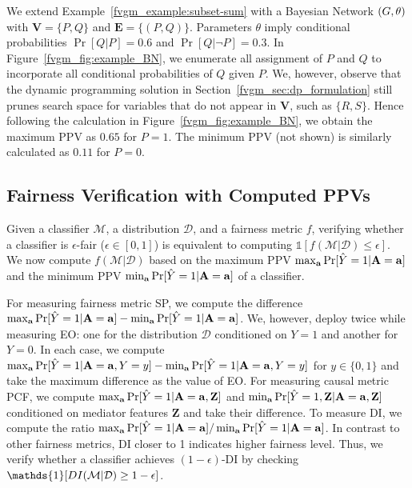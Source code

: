 	 
	\begin{example}
		We extend Example~\ref{fvgm_example:subset-sum} with a Bayesian Network $ (G, \theta) $ with $ \mathbf{V} = \{P, Q\} $ and $ \mathbf{E} = \{(P,Q)\} $. Parameters $ \theta $ imply conditional probabilities $ \Pr[Q|P] = 0.6 $ and $ \Pr[Q|\neg P] = 0.3 $. 	In Figure~\ref{fvgm_fig:example_BN}, we enumerate all  assignment of $ P $ and $ Q $ to  incorporate all conditional probabilities of $ Q $ given $ P $. We, however, observe that the dynamic programming solution in Section~\ref{fvgm_sec:dp_formulation} still prunes search space for variables that do not appear in $ \mathbf{V} $, such as $ \{R, S\} $. Hence following the calculation in Figure~\ref{fvgm_fig:example_BN}, we obtain the maximum PPV  as $ 0.65 $ for $ P = 1 $. The minimum PPV (not shown)  is similarly calculated as $ 0.11 $ for $ P = 0 $. 
	\end{example}


	\subsection{Fairness Verification with Computed PPVs} 
	Given a classifier $\mathcal{M}$, a  distribution $\mathcal{D}$, and a fairness metric $f$, verifying whether a classifier is $\epsilon$-fair ($\epsilon \in [0,1]$) is equivalent to computing $\mathds{1}[f(\mathcal{M}|\mathcal{D})\leq \epsilon]$. We now compute $f(\mathcal{M}|\mathcal{D})$ based on the maximum PPV $ \max_{ \mathbf{a}} \Pr[\hat{Y} =1 | \mathbf{A} = \mathbf{a}] $ and the  minimum PPV $ \min_{ \mathbf{a}} \Pr[\hat{Y} =1 | \mathbf{A} = \mathbf{a}] $ of a classifier.
	
	For measuring fairness metric SP, we compute the difference $ \max_{ \mathbf{a}} \Pr[\hat{Y} =1 | \mathbf{A} = \mathbf{a}]  - \min_{ \mathbf{a}} \Pr[\hat{Y} =1 | \mathbf{A} = \mathbf{a}] $. We, however, deploy {\fvgm} twice while measuring EO: one for the distribution $ \mathcal{D} $ conditioned on $ Y = 1  $ and another for $ Y = 0 $. 
	In each case, we compute $ \max_{ \mathbf{a}} \Pr[\hat{Y} =1 | \mathbf{A} = \mathbf{a}, Y = y ]  - \min_{ \mathbf{a}} \Pr[\hat{Y} =1 | \mathbf{A} = \mathbf{a}, Y = y ] $ for $ y \in \{0,1\} $ and take the  maximum difference as the value of EO.  
	For measuring causal metric PCF, we compute  $ \max_{ \mathbf{a}} \Pr[\hat{Y} =1 | \mathbf{A} = \mathbf{a}, \mathbf{Z}] $ and  $ \min_{ \mathbf{a}} \Pr[\hat{Y} =1, \mathbf{Z}| \mathbf{A} = \mathbf{a} , \mathbf{Z}] $ conditioned on mediator features $ \mathbf{Z} $ and take their difference. 
	To measure DI, we compute the ratio $ \max_{ \mathbf{a}} \Pr[\hat{Y} =1 | \mathbf{A} = \mathbf{a}] / \min_{ \mathbf{a}} \Pr[\hat{Y} =1 | \mathbf{A} = \mathbf{a}] $. In contrast to other fairness metrics, DI closer to 1 indicates higher fairness level. Thus, we verify whether a classifier achieves $(1 - \epsilon)$-DI by checking $ \mathds{1}[DI(\alg| \mathcal{D}) \ge 1 - \epsilon] $. 
	
